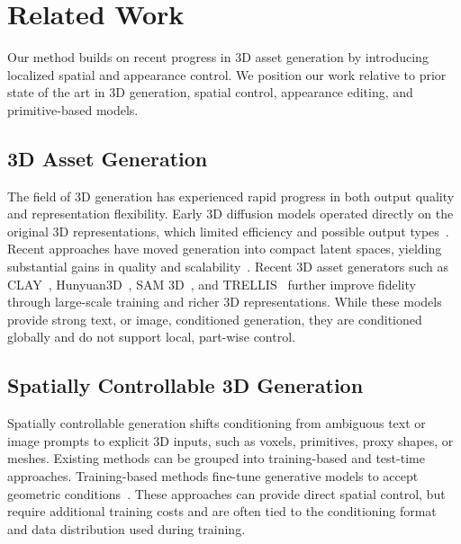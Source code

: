 
\section{Related Work}

\noindent Our method builds on recent progress in 3D asset generation by introducing localized spatial and appearance control. We position our work relative to prior state of the art in 3D generation, spatial control, appearance editing, and primitive-based models.


\subsection{3D Asset Generation}
\label{sec:rw_3d_generation}

The field of 3D generation has experienced rapid progress in both output quality and representation flexibility. Early 3D diffusion models operated directly on the original 3D representations, which limited efficiency and possible output types~\cite{nichol2022pointegenerating3dpoint}. Recent approaches have moved generation into compact latent spaces, yielding substantial gains in quality and scalability~\cite{NEURIPS2022_40e56dab,jun2023shapegeneratingconditional3d}. Recent 3D asset generators such as CLAY~\cite{10.1145/3658146}, Hunyuan3D~\cite{hunyuan3d22025tencent}, SAM 3D~\cite{Chen_2026_CVPR}, and TRELLIS~\cite{Xiang_2025_CVPR} further improve fidelity through large-scale training and richer 3D representations. While these models provide strong text, or image, conditioned generation, they are conditioned globally and do not support local, part-wise control.



\subsection{Spatially Controllable 3D Generation} 
\label{sec:rw_spatial_control}

Spatially controllable generation shifts conditioning from ambiguous text or image prompts to explicit 3D inputs, such as voxels, primitives, proxy shapes, or meshes. Existing methods can be grouped into training-based and test-time approaches. Training-based methods fine-tune generative models to accept geometric conditions~\cite{NEURIPS2022_40e56dab, 10.1145/3641519.3657461}. These approaches can provide direct spatial control, but require additional training costs and are often tied to the conditioning format and data distribution used during training. 

